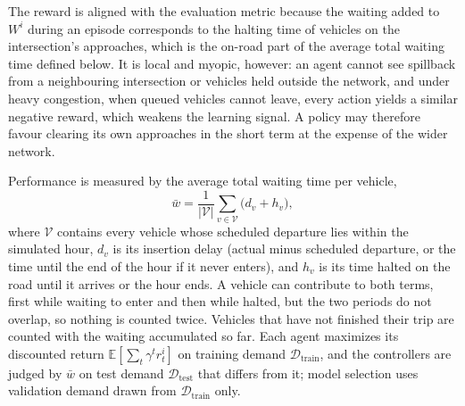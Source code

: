 The reward is aligned with the evaluation metric because the waiting added to $W^i$ during an episode corresponds to the halting time of vehicles on the intersection's approaches, which is the on-road part of the average total waiting time defined below. It is local and myopic, however: an agent cannot see spillback from a neighbouring intersection or vehicles held outside the network, and under heavy congestion, when queued vehicles cannot leave, every action yields a similar negative reward, which weakens the learning signal. A policy may therefore favour clearing its own approaches in the short term at the expense of the wider network.

Performance is measured by the average total waiting time per vehicle,
\begin{equation}
  \bar{w} = \frac{1}{|\mathcal{V}|} \sum_{v \in \mathcal{V}} \big(d_v + h_v\big),
  \label{eq:wbar}
\end{equation}
where $\mathcal{V}$ contains every vehicle whose scheduled departure lies within the simulated hour, $d_v$ is its insertion delay (actual minus scheduled departure, or the time until the end of the hour if it never enters), and $h_v$ is its time halted on the road until it arrives or the hour ends. A vehicle can contribute to both terms, first while waiting to enter and then while halted, but the two periods do not overlap, so nothing is counted twice. Vehicles that have not finished their trip are counted with the waiting accumulated so far. Each agent maximizes its discounted return $\mathbb{E}[\sum_t \gamma^t r^i_t]$ on training demand $\mathcal{D}_{\text{train}}$, and the controllers are judged by $\bar{w}$ on test demand $\mathcal{D}_{\text{test}}$ that differs from it; model selection uses validation demand drawn from $\mathcal{D}_{\text{train}}$ only.
